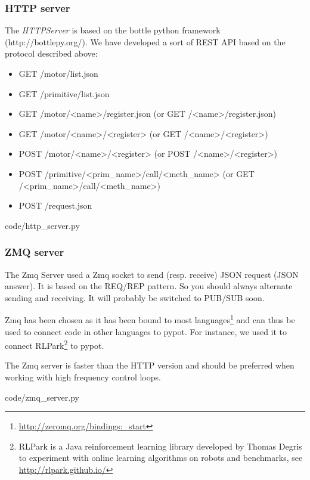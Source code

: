 \subsubsection{HTTP server} %

The \emph{HTTPServer }is based on the bottle python framework (http://bottlepy.org/). We have developed a sort of REST API based on the protocol described above:

\begin{itemize}
    \item GET /motor/list.json
    \item GET /primitive/list.json
    \item GET /motor/<name>/register.json (or GET /<name>/register.json)
    \item GET /motor/<name>/<register> (or GET /<name>/<register>)
    \item POST /motor/<name>/<register> (or POST /<name>/<register>)
    \item POST /primitive/<prim\_name>/call/<meth\_name> (or GET /<prim\_name>/call/<meth\_name>)
    \item POST /request.json
\end{itemize}



    {code/http_server.py}


\subsubsection{ZMQ server} %

The Zmq Server used a Zmq socket to send (resp. receive) JSON request (JSON answer). It is based on the REQ/REP pattern. So you should always alternate sending and receiving. It will probably be switched to PUB/SUB soon.

Zmq has been chosen as it has been bound to most languages\footnote{\url{http://zeromq.org/bindings:_start}} and can thus be used to connect code in other languages to pypot. For instance, we used it to connect RLPark\footnote{RLPark is a Java reinforcement learning library developed by Thomas Degris to experiment with online learning algorithms on robots and benchmarks, see \url{http://rlpark.github.io/}} to pypot.

The Zmq server is faster than the HTTP version and should be preferred when working with high frequency control loops.


    {code/zmq_server.py}


